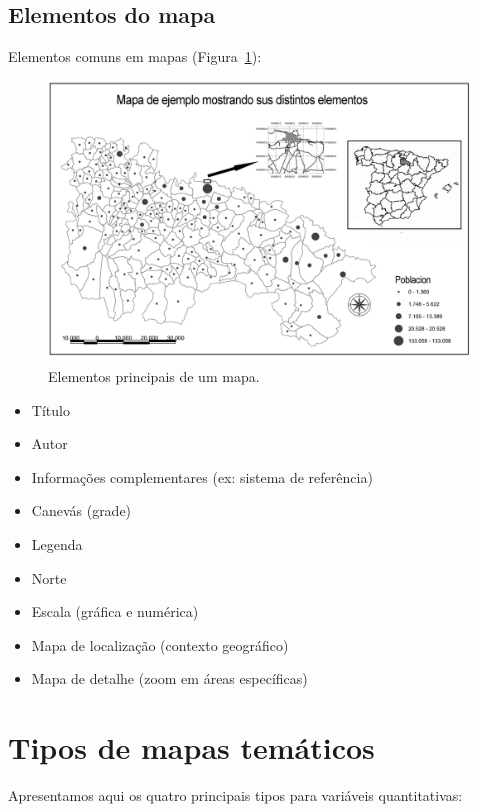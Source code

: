 \subsection{Elementos do mapa}

Elementos comuns em mapas (Figura~\ref{Fig:ElementosMapa}):

\begin{figure}[!hbt]
\centering
\includegraphics[width=\columnwidth]{Visualizacao/ElementosMapa.png}
\caption{\small Elementos principais de um mapa.}
\label{Fig:ElementosMapa} 
\end{figure}

\begin{itemize}
 \item Título
 \item Autor
 \item Informações complementares (ex: sistema de referência)
 \item Canevás (grade)
 \item Legenda
 \item Norte
 \item Escala (gráfica e numérica)
 \item Mapa de localização (contexto geográfico)
 \item Mapa de detalhe (zoom em áreas específicas)
\end{itemize}

\section{Tipos de mapas temáticos}

Apresentamos aqui os quatro principais tipos para variáveis quantitativas:

